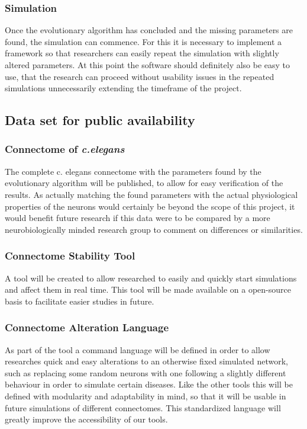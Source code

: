 \documentclass[a4paper,11pt]{article}
\begin{document}
\subsubsection{Simulation}
Once the evolutionary algorithm has concluded and the missing parameters are found, the simulation can commence. For this it is necessary to implement a framework so that researchers can easily repeat the simulation with slightly altered parameters. At this point the software should definitely also be easy to use, that the research can proceed without usability issues in the repeated simulations unnecessarily extending the timeframe of the project.

\subsection{Data set for public availability}
\subsubsection{Connectome of \emph{c.elegans}}
The complete c. elegans connectome with the parameters found by the evolutionary algorithm will be published, to allow for easy verification of the results. As actually matching the found parameters with the actual physiological properties of the neurons would certainly be beyond the scope of this project, it would benefit future research if this data were to be compared by a more neurobiologically minded research group to comment on differences or similarities.

\subsubsection{Connectome Stability Tool}
A tool will be created to allow researched to easily and quickly start simulations and affect them in real time. This tool will be made available on a open-source  basis to facilitate easier studies in future. 

\subsubsection{Connectome Alteration Language}
As part of the tool a command language will be defined in order to allow researches quick and easy alterations to an otherwise fixed simulated network, such as replacing some random neurons with one following a slightly different behaviour in order to simulate certain diseases. Like the other tools this will be defined with modularity and adaptability in mind, so that it will be usable in future simulations of different connectomes. This standardized language will greatly improve the accessibility of our tools.
\end{document}
